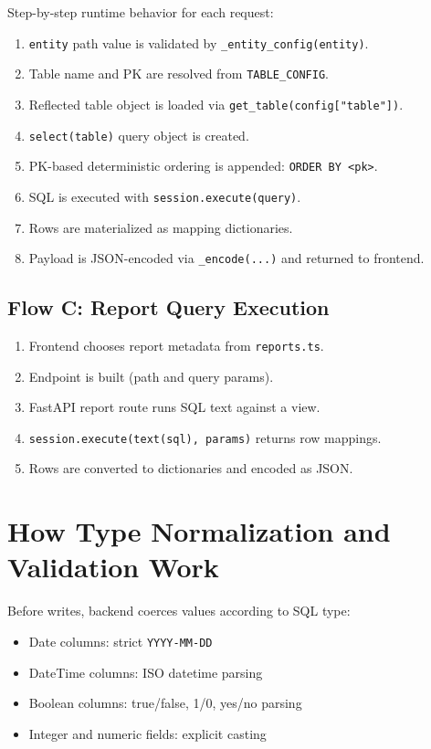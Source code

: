 \documentclass[11pt,a4paper]{article}
\begin{document}
Step-by-step runtime behavior for each request:
\begin{enumerate}
  \item \texttt{entity} path value is validated by \texttt{\_entity\_config(entity)}.
  \item Table name and PK are resolved from \texttt{TABLE\_CONFIG}.
  \item Reflected table object is loaded via \texttt{get\_table(config["table"])}.
  \item \texttt{select(table)} query object is created.
  \item PK-based deterministic ordering is appended: \texttt{ORDER BY <pk>}.
  \item SQL is executed with \texttt{session.execute(query)}.
  \item Rows are materialized as mapping dictionaries.
  \item Payload is JSON-encoded via \texttt{\_encode(...)} and returned to frontend.
\end{enumerate}

\subsection{Flow C: Report Query Execution}
\begin{enumerate}
  \item Frontend chooses report metadata from \texttt{reports.ts}.
  \item Endpoint is built (path and query params).
  \item FastAPI report route runs SQL text against a view.
  \item \texttt{session.execute(text(sql), params)} returns row mappings.
  \item Rows are converted to dictionaries and encoded as JSON.
\end{enumerate}

\section{How Type Normalization and Validation Work}
Before writes, backend coerces values according to SQL type:
\begin{itemize}
  \item Date columns: strict \texttt{YYYY-MM-DD}
  \item DateTime columns: ISO datetime parsing
  \item Boolean columns: true/false, 1/0, yes/no parsing
  \item Integer and numeric fields: explicit casting
\end{itemize}
\end{document}
